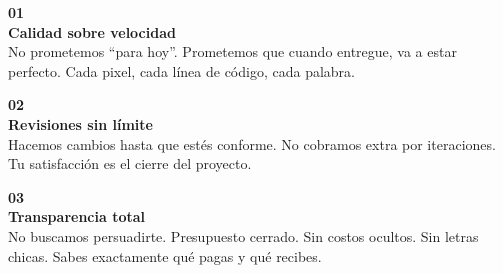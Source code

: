 \documentclass[11pt, a4paper]{article}
\begin{document}
  \noindent
  \begin{minipage}[t]{0.31\textwidth}
    \begin{tcolorbox}
      [colback=lightslate, colframe=bordergray, arc=2mm, boxrule=0.5pt, left=4mm,
      right=4mm, top=4mm, bottom=4mm]
      \color{darkslate}
      \begin{center}
        {\color{mainblue}\LARGE\bfseries 01} \\[2mm] {\small\bfseries Calidad sobre velocidad}
        \\[2mm] {\footnotesize\color{basicgray}No prometemos ``para hoy''. Prometemos que cuando entregue, va a estar perfecto. Cada pixel, cada línea de código, cada palabra.}
      \end{center}
    \end{tcolorbox}
  \end{minipage}
  \hfill
  \begin{minipage}[t]{0.31\textwidth}
    \begin{tcolorbox}
      [colback=lightslate, colframe=bordergray, arc=2mm, boxrule=0.5pt, left=4mm,
      right=4mm, top=4mm, bottom=4mm]
      \color{darkslate}
      \begin{center}
        {\color{mainblue}\LARGE\bfseries 02} \\[2mm] {\small\bfseries Revisiones sin límite}
        \\[2mm] {\footnotesize\color{basicgray}Hacemos cambios hasta que estés conforme. No cobramos extra por iteraciones. Tu satisfacción es el cierre del proyecto.}
      \end{center}
    \end{tcolorbox}
  \end{minipage}
  \hfill
  \begin{minipage}[t]{0.31\textwidth}
    \begin{tcolorbox}
      [colback=lightslate, colframe=bordergray, arc=2mm, boxrule=0.5pt, left=4mm,
      right=4mm, top=4mm, bottom=4mm]
      \color{darkslate}
      \begin{center}
        {\color{mainblue}\LARGE\bfseries 03} \\[2mm] {\small\bfseries Transparencia total}
        \\[2mm] {\footnotesize\color{basicgray}No buscamos persuadirte. Presupuesto cerrado. Sin costos ocultos. Sin letras chicas. Sabes exactamente qué pagas y qué recibes.}
      \end{center}
    \end{tcolorbox}
  \end{minipage}
\end{document}
